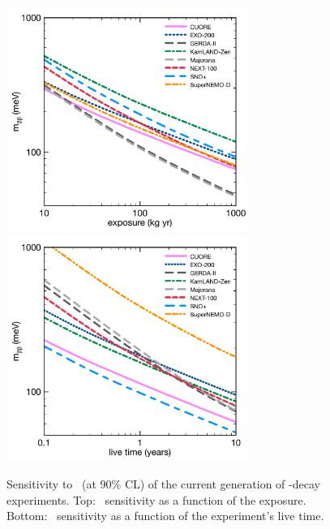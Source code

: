 \documentclass{PoS}
\begin{document}
\begin{figure}
\centering
\includegraphics[width=0.7\textwidth]{img/SensNMCurrentGenExposure.pdf}
\includegraphics[width=0.7\textwidth]{img/SensNMCurrentGenTime.pdf}
\caption{Sensitivity to \mbb\ (at 90\% CL) of the current generation of \bbonu-decay experiments. Top: \mbb\ sensitivity as a function of the exposure. Bottom: \mbb\ sensitivity as a function of the experiment's live time.} \label{fig:SensNMCurrentGen}
\end{figure}
\end{document}
